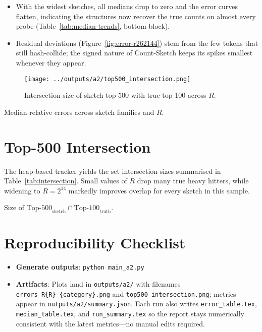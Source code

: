 \documentclass[11pt]{article}
\begin{document}
\begin{itemize}
  \item With the widest sketches, all medians drop to zero and the error curves flatten, indicating the structures now recover the true counts on almost every probe (Table~\ref{tab:median-trends}, bottom block).
  \item Residual deviations (Figure~\ref{fig:error-r262144}) stem from the few tokens that still hash-collide; the signed nature of Count-Sketch keeps its spikes smallest whenever they appear.
\end{itemize}


\begin{figure}[H]
  \centering
  \texttt{[image: ../outputs/a2/top500\_intersection.png]}
  \caption{Intersection size of sketch top-500 with true top-100 across $R$.}
 \label{fig:top500}
\end{figure}


\begin{table}[H]
  \centering
  
  \caption{Median relative errors across sketch families and $R$.}
  \label{tab:median-trends}
\end{table}






\section{Top-500 Intersection}
The heap-based tracker yields the set intersection sizes summarised in Table~\ref{tab:intersection}. Small values of $R$ drop many true heavy hitters, while widening to $R=2^{14}$ markedly improves overlap for every sketch in this sample.

\begin{table}[H]
  \centering
  
  \caption{Size of $\text{Top-500}_{\text{sketch}} \cap \text{Top-100}_{\text{truth}}$.}
  \label{tab:intersection}
\end{table}

\section{Reproducibility Checklist}
\begin{itemize}
  \item \textbf{Generate outputs}: \verb|python main_a2.py|\ 
  \item \textbf{Artifacts}: Plots land in \texttt{outputs/a2/} with filenames \texttt{errors\_R\{R\}\_\{category\}.png} and \texttt{top500\_intersection.png}; metrics appear in \texttt{outputs/a2/summary.json}. Each run also writes \texttt{error\_table.tex}, \texttt{median\_table.tex}, and \texttt{run\_summary.tex} so the report stays numerically consistent with the latest metrics—no manual edits required.
\end{itemize}
\end{document}
